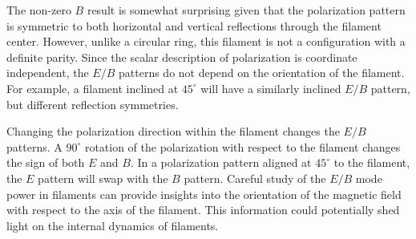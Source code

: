\documentclass[a4paper,11pt]{article}
\begin{document}
The non-zero $B$ result is somewhat surprising given that the polarization pattern is symmetric to both horizontal and vertical reflections through the filament center.  However, unlike a circular ring, this filament is not a configuration with a definite parity.  Since the scalar description of polarization is coordinate independent, the $E/B$ patterns do not depend on the orientation of the filament.  For example, a filament inclined at $45^\circ$ will have a similarly inclined $E/B$ pattern, but different reflection symmetries.  

 Changing the polarization direction within the filament changes the $E/B$ patterns.  A $90^\circ$ rotation of the polarization with respect to the filament changes the sign of both $E$ and $B$.  In a polarization pattern aligned at $45^\circ$ to the filament, the $E$ pattern will swap with the $B$ pattern.  Careful study of the $E/B$ mode power in filaments can provide insights into the orientation of the magnetic field with respect to the axis of the filament.  This information could potentially shed light on the internal dynamics of filaments.
% 
\end{document}
